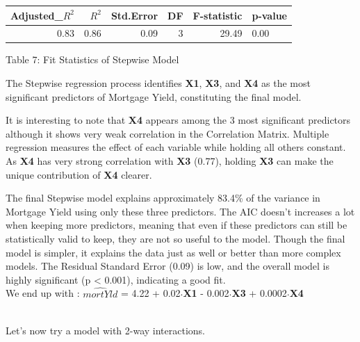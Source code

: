 \documentclass[
  12pt,
]{article}
\begin{document}
\addtocounter{table}{2}
\vspace{0.3em}
\begin{table}[!h]
\centering\begingroup\fontsize{8}{10}\selectfont

\begin{tabular}{rrrrrl}
\toprule
Adjusted\_$R^{2}$ & $R^2$ & Std.Error & DF & F-statistic & p-value\\
\midrule
0.83 & 0.86 & 0.09 & 3 & 29.49 & 0.00\\
\bottomrule
\end{tabular}
\endgroup{}
\end{table}
\begin{center}
\vspace{-1.5em}
{\fontsize{12}{14}\selectfont Table 7: Fit Statistics of Stepwise Model\par}
\end{center}

The Stepwise regression process identifies \textbf{X1}, \textbf{X3}, and
\textbf{X4} as the most significant predictors of Mortgage Yield,
constituting the final model.

It is interesting to note that \textbf{X4} appears among the 3 most
significant predictors although it shows very weak correlation in the
Correlation Matrix. Multiple regression measures the effect of each
variable while holding all others constant. As \textbf{X4} has very
strong correlation with \textbf{X3} (0.77), holding \textbf{X3} can make
the unique contribution of \textbf{X4} clearer.

The final Stepwise model explains approximately 83.4\% of the variance
in Mortgage Yield using only these three predictors. The AIC doesn't
increases a lot when keeping more predictors, meaning that even if these
predictors can still be statistically valid to keep, they are not so
useful to the model. Though the final model is simpler, it explains the
data just as well or better than more complex models. The Residual
Standard Error (0.09) is low, and the overall model is highly
significant (p \textless{} 0.001), indicating a good fit.\\
We end up with : \(\hat{mortYld}\) = 4.22 + 0.02\(\cdot\)\textbf{X1} -
0.002\(\cdot\)\textbf{X3} + 0.0002\(\cdot\)\textbf{X4}\\
\strut \\
Let's now try a model with 2-way interactions.
\end{document}
